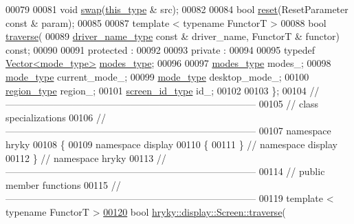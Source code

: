 \begin{DoxyCode}
00079 
00081     \textcolor{keywordtype}{void} \hyperlink{classhryky_1_1display_1_1_screen_a2102e2a1ee2d94af8294209c95e35c52}{swap}(\hyperlink{classhryky_1_1display_1_1_screen}{this_type} & src);
00082 
00084     \textcolor{keywordtype}{bool} \hyperlink{classhryky_1_1display_1_1_screen_a1c77857a9711011c99c2ec453cce4581}{reset}(ResetParameter \textcolor{keyword}{const} & param);
00085 
00087     \textcolor{keyword}{template} < \textcolor{keyword}{typename} FunctorT >
00088     \textcolor{keywordtype}{bool} \hyperlink{classhryky_1_1display_1_1_screen_a463c4efa1605ddda167d86baf49ae79c}{traverse}(
00089         \hyperlink{classhryky_1_1_string}{driver_name_type} \textcolor{keyword}{const} & driver\_name, FunctorT & functor) \textcolor{keyword}{const};
00090 
00091 \textcolor{keyword}{protected} :
00092 
00093 \textcolor{keyword}{private} :
00094 
00095     \textcolor{keyword}{typedef} \hyperlink{classhryky_1_1_vector}{Vector<mode_type>} \hyperlink{classhryky_1_1_vector}{modes_type};
00096 
00097     \hyperlink{classhryky_1_1_vector}{modes_type}          modes\_;
00098     \hyperlink{classhryky_1_1display_1_1_mode}{mode_type}           current\_mode\_;
00099     \hyperlink{classhryky_1_1display_1_1_mode}{mode_type}           desktop\_mode\_;
00100     \hyperlink{classhryky_1_1geometry_1_1_rect}{region_type}         region\_;
00101     \hyperlink{namespacehryky_1_1display_a09f7398edae025e4ee4e505b5cdf954c}{screen_id_type}      id\_;
00102 
00103 \};
00104 \textcolor{comment}{//
      ------------------------------------------------------------------------------}
00105 \textcolor{comment}{// class specializations}
00106 \textcolor{comment}{//
      ------------------------------------------------------------------------------}
00107 \textcolor{keyword}{namespace }hryky
00108 \{
00109 \textcolor{keyword}{namespace }display
00110 \{
00111 \} \textcolor{comment}{// namespace display}
00112 \} \textcolor{comment}{// namespace hryky}
00113 \textcolor{comment}{//
      ------------------------------------------------------------------------------}
00114 \textcolor{comment}{// public member functions}
00115 \textcolor{comment}{//
      ------------------------------------------------------------------------------}
00119 \textcolor{comment}{}\textcolor{keyword}{template} < \textcolor{keyword}{typename} FunctorT >
\hypertarget{display__screen_8h_source_l00120}{}\hyperlink{classhryky_1_1display_1_1_screen_a463c4efa1605ddda167d86baf49ae79c}{00120} \textcolor{keywordtype}{bool} \hyperlink{classhryky_1_1display_1_1_screen_a463c4efa1605ddda167d86baf49ae79c}{hryky::display::Screen::traverse}(

\end{DoxyCode}

